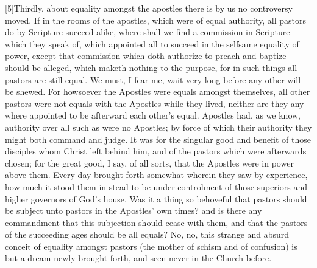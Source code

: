 [5]Thirdly, about equality amongst the apostles there is by us no controversy moved. If in the rooms of the apostles, which were of equal authority, all pastors do by Scripture succeed alike, where shall we find a commission in Scripture which they speak of, which appointed all to succeed in the selfsame equality of power, except that commission which doth authorize to preach and baptize should be alleged, which maketh nothing to the purpose, for in such things all pastors are still equal. We must, I fear me, wait very long before any other will be shewed. For howsoever the Apostles were equals amongst themselves, all other pastors were not equals with the Apostles while they lived, neither are they any where appointed to be afterward each other’s equal. Apostles had, as we know, authority over all such as were no Apostles; by force of which their authority they might both command and judge. It was for the singular good and benefit of those disciples whom Christ left behind him, and of the pastors which were afterwards chosen; for the great  good,
 I say, of all sorts, that the Apostles were in power above them. Every day brought forth somewhat wherein they saw by experience, how much it stood them in stead to be under controlment of those superiors and higher governors of God’s house. Was it a thing so behoveful that pastors should be subject unto pastors in the Apostles’ own times? and is there any commandment that this subjection should cease with them, and that the pastors of the succeeding ages should be all equals? No, no, this strange and absurd conceit of equality amongst pastors (the mother of schism and of confusion) is but a dream newly brought forth, and seen never in the Church before.

